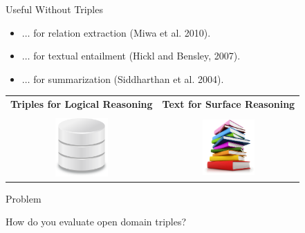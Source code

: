 \def\title{Useful Without Triples}
\begin{frame}{\title}
\begin{itemize}
\item $\dots$ for relation extraction (Miwa et al. 2010).
\item $\dots$ for textual entailment (Hickl and Bensley, 2007).
\item $\dots$ for summarization (Siddharthan et al. 2004).
\end{itemize}
\vspace{0.5cm}
\pause

\begin{center}
\begin{tabular}{cc}
\textbf{Triples for Logical Reasoning} & \textbf{Text for Surface Reasoning} \\
& \\
\includegraphics[width=2cm]{../img/database.png} & 
  \includegraphics[width=2cm]{../img/books.png}
\end{tabular}
\end{center}

\end{frame}


\begin{frame}{Problem}
\begin{center}
How do you evaluate open domain triples?
\end{center}
\end{frame}

